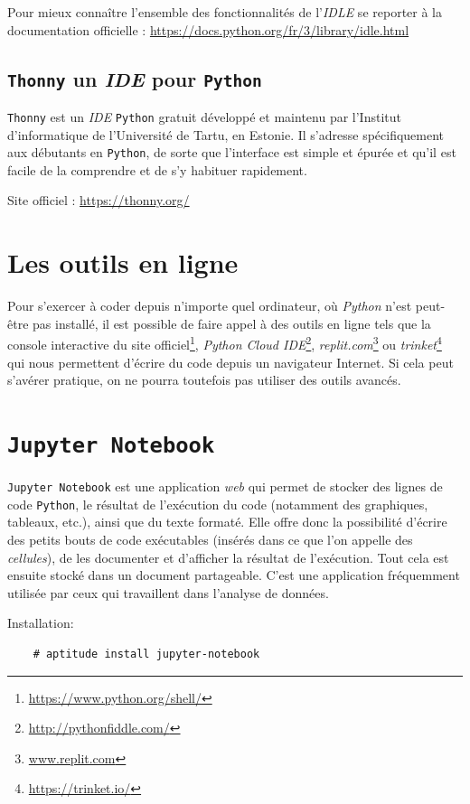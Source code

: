 Pour mieux connaître l'ensemble des fonctionnalités de l'\textit{IDLE} se reporter à la documentation officielle : \url{https://docs.python.org/fr/3/library/idle.html}
\medskip

\subsection*{\texttt{Thonny} un \textit{IDE} pour \texttt{Python}}
\texttt{Thonny} est un \textit{IDE} \texttt{Python} gratuit développé et maintenu par l'Institut d'informatique de l'Université de Tartu, en Estonie. Il s'adresse spécifiquement aux débutants en \texttt{Python}, de sorte que l'interface est simple et épurée et qu'il est facile de la comprendre et de s'y habituer rapidement.
\medskip

Site officiel : \url{https://thonny.org/}
\medskip

\section{Les outils en ligne}
Pour s'exercer à coder depuis n'importe quel ordinateur, où \textit{Python} n'est peut-être pas installé, il est possible de faire appel à des outils en ligne tels que la console interactive du site officiel\footnote{\url{https://www.python.org/shell/}}, \textit{Python Cloud IDE}\footnote{\url{http://pythonfiddle.com/}}, \textit{replit.com}\footnote{\url{www.replit.com}} ou \textit{trinket}\footnote{\url{https://trinket.io/}} qui nous permettent d'écrire du code depuis un navigateur Internet. Si cela peut s'avérer pratique, on ne pourra toutefois pas utiliser des outils avancés.
\medskip

\section{\texttt{Jupyter Notebook}}
\texttt{Jupyter Notebook} est une application \textit{web} qui permet de stocker des lignes de code \texttt{Python}, le résultat de l'exécution du code (notamment des graphiques, tableaux, etc.), ainsi que du texte formaté. Elle offre donc la possibilité d'écrire des petits bouts de code exécutables (insérés dans ce que l'on appelle des \textit{cellules}), de les documenter et d'afficher la résultat de l'exécution. Tout cela est ensuite stocké dans un document partageable. C'est une application fréquemment utilisée par ceux qui travaillent dans l'analyse de données.
\medskip

Installation:
\begin{verbatim}
    # aptitude install jupyter-notebook
\end{verbatim}
\medskip


